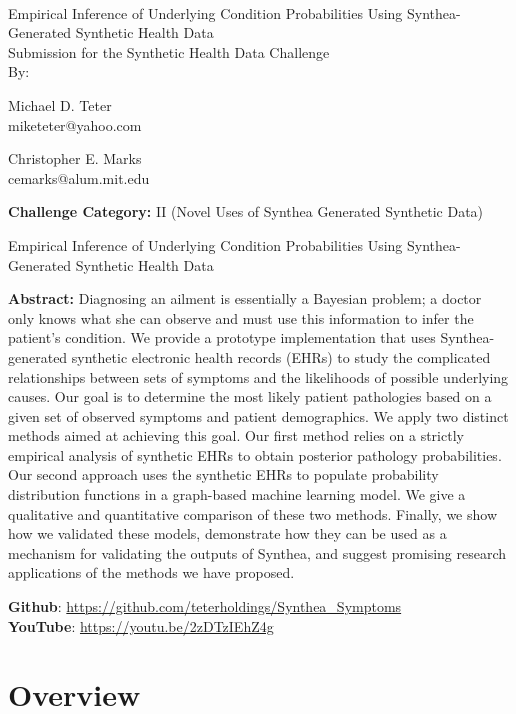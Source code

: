 \documentclass[11pt]{article}
\newcommand{\solutiontitle}{Empirical Inference of Underlying Condition Probabilities Using Synthea-Generated Synthetic Health Data}
\newcommand{\challengecategory}{II (Novel Uses of Synthea Generated Synthetic Data)}
\newcommand{\ABSTRACT}{Diagnosing an ailment is essentially a Bayesian problem; a doctor only knows what she can observe and must use this information to infer the patient's condition.  We provide a prototype implementation that uses Synthea-generated synthetic electronic health records (EHRs) to study the complicated relationships between sets of symptoms and the likelihoods of possible underlying causes.  Our goal is to determine the most likely patient pathologies based on a given set of observed symptoms and patient demographics. We apply two distinct methods aimed at achieving this goal.  Our first method relies on a strictly empirical analysis of synthetic EHRs to obtain posterior pathology probabilities.  Our second approach uses the synthetic EHRs to populate probability distribution functions in a graph-based machine learning model.  We give a qualitative and quantitative comparison of these two methods.  Finally, we show how we validated these models, demonstrate how they can be used as a mechanism for validating the outputs of Synthea, and suggest promising research applications of the methods we have proposed.
}
\begin{document}

\thispagestyle{empty}

~

\begin{center}
    {\huge \solutiontitle} \\[24pt]
    {\Large Submission for the Synthetic Health Data Challenge} \\[24pt]
    {\Large By:} \\[24pt]
\end{center}

\begin{multicols}{2}
\begin{center}
	Michael D. Teter\\
	miketeter@yahoo.com
\end{center}

\columnbreak

\begin{center}
    Christopher E. Marks\\
    cemarks@alum.mit.edu
\end{center}
\end{multicols}



\noindent \textbf{Challenge Category:} \challengecategory
\\


\clearpage


\setcounter{page}{1}

\begin{center}
  {\LARGE \solutiontitle}
  \\[11pt]
  \begin{minipage}{0.9\textwidth}
    \textbf{Abstract:}
    \ABSTRACT
  \end{minipage}
\end{center}
\vspace{11pt}

\noindent \textbf{Github}: \url{https://github.com/teterholdings/Synthea_Symptoms}\\
\noindent \textbf{YouTube}: \url{https://youtu.be/2zDTzIEhZ4g}

\section{Overview} \label{sec: overview}
\end{document}
